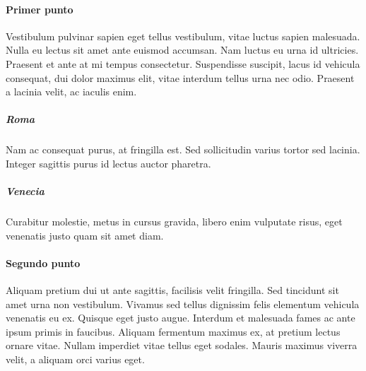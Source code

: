 \documentclass{article}
\begin{document}
\paragraph{Primer punto}

Vestibulum pulvinar sapien eget tellus vestibulum, vitae luctus sapien malesuada. Nulla eu lectus sit amet ante euismod accumsan. Nam luctus eu urna id ultricies. Praesent et ante at mi tempus consectetur. Suspendisse suscipit, lacus id vehicula consequat, dui dolor maximus elit, vitae interdum tellus urna nec odio. Praesent a lacinia velit, ac iaculis enim. \subparagraph {Roma} Nam ac consequat purus, at fringilla est. Sed sollicitudin varius tortor sed lacinia. Integer sagittis purus id lectus auctor pharetra. \subparagraph {Venecia} Curabitur molestie, metus in cursus gravida, libero enim vulputate risus, eget venenatis justo quam sit amet diam.

\paragraph{Segundo punto}

Aliquam pretium dui ut ante sagittis, facilisis velit fringilla. Sed tincidunt sit amet urna non vestibulum. Vivamus sed tellus dignissim felis elementum vehicula venenatis eu ex. Quisque eget justo augue. Interdum et malesuada fames ac ante ipsum primis in faucibus. Aliquam fermentum maximus ex, at pretium lectus ornare vitae. Nullam imperdiet vitae tellus eget sodales. Mauris maximus viverra velit, a aliquam orci varius eget.
\end{document}
